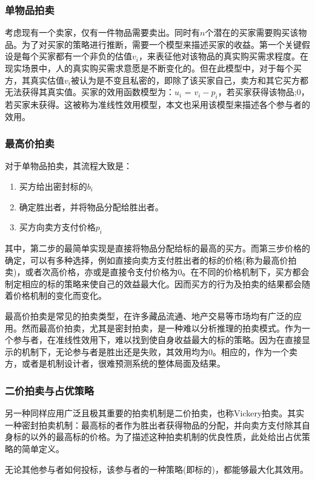 \documentclass[promaster]{thesis-uestc}
\begin{document}
\subsubsection{单物品拍卖}
考虑现有一个卖家，仅有一件物品需要卖出。同时有$n$个潜在的买家需要购买该物品。为了对买家的策略进行推断，需要一个模型来描述买家的收益。第一个关键假设是每个买家都有一个非负的估值$v_i$，来表征他对该物品的真实购买需求程度。在现实场景中，人的真实购买需求意愿是不断变化的。但在此模型中，对于每个买方，其真实估值$v_i$被认为是不变且私密的，即除了该买家自己，卖方和其它买方都无法获得其真实值。买家的效用函数模型为：$u_i$ = $v_i-p_i$，若买家获得该物品;$0$，若买家未获得。这被称为准线性效用模型，本文也采用该模型来描述各个参与者的效用。

\subsubsection{最高价拍卖}
对于单物品拍卖，其流程大致是：

\begin{enumerate}
    \item 买方给出密封标的$b_i$
    \item 确定胜出者，并将物品分配给胜出者。
    \item 买方向卖方支付价格$p_i$
\end{enumerate} 

其中，第二步的最简单实现是直接将物品分配给标的最高的买方。而第三步价格的确定，可以有多种选择，例如直接向卖方支付胜出者的标的价格(称为最高价拍卖)，或者次高价格，亦或是直接令支付价格为0。在不同的价格机制下，买方都会制定相应的标的策略来使自己的效益最大化。因而买方的行为及拍卖的结果都会随着价格机制的变化而变化。

最高价拍卖是常见的拍卖类型，在许多藏品流通、地产交易等市场均有广泛的应用。然而最高价拍卖，尤其是密封拍卖，是一种难以分析推理的拍卖模式。作为一个参与者，在准线性效用下，难以找到使自身收益最大的标的策略。因为在直接显示的机制下，无论参与者是胜出还是失败，其效用均为0。相应的，作为一个卖方，或者是机制设计者，很难预测系统的整体局面及结果。

\subsubsection{二价拍卖与占优策略}
 另一种同样应用广泛且极其重要的拍卖机制是二价拍卖，也称Vickery拍卖。其实一种密封拍卖机制：最高标的者作为胜出者获得物品的分配，并向卖方支付除其自身标的以外的最高标的价格。为了描述这种拍卖机制的优良性质，此处给出占优策略的简单定义。
 
 \begin{definition}[占优策略]
     无论其他参与者如何投标，该参与者的一种策略(即标的)，都能够最大化其效用。
 \end{definition}
 
\end{document}
